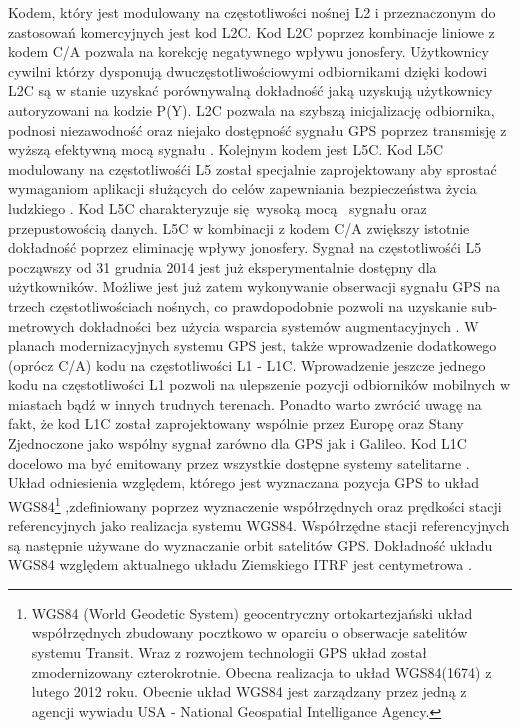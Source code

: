 Kodem, który jest modulowany na częstotliwości nośnej L2 i przeznaczonym do zastosowań komercyjnych jest kod L2C. Kod L2C poprzez kombinacje liniowe z kodem C/A pozwala 
na korekcję negatywnego wpływu jonosfery. Użytkownicy cywilni którzy dysponują dwuczęstotliwościowymi odbiornikami dzięki kodowi L2C są w stanie uzyskać porównywalną
dokładność jaką uzyskują użytkownicy autoryzowani na kodzie P(Y). L2C pozwala na szybszą inicjalizację odbiornika, podnosi niezawodność oraz niejako dostępność sygnału 
GPS poprzez transmisję z wyższą efektywną mocą sygnału \cite[]{GPS_GOV}. Kolejnym kodem jest L5C. Kod L5C modulowany na częstotliwośći L5 został specjalnie zaprojektowany 
aby sprostać wymaganiom aplikacji służących do celów zapewniania bezpieczeństwa życia ludzkiego \cite[][strona 335]{hofmann_gnss}. Kod L5C charakteryzuje się wysoką mocą 
sygnału oraz przepustowością danych. L5C w kombinacji z kodem C/A zwiększy istotnie dokładność poprzez eliminację wpływy jonosfery. Sygnał na częstotliwośći L5 
począwszy od 31 grudnia 2014 jest już eksperymentalnie dostępny dla użytkowników. Możliwe jest już zatem wykonywanie obserwacji sygnału GPS na trzech częstotliwościach nośnych,
co prawdopodobnie pozwoli na uzyskanie sub-metrowych dokładności bez użycia wsparcia systemów augmentacyjnych \cite[]{GPS_GOV}. W planach modernizacyjnych systemu GPS jest,
także wprowadzenie dodatkowego (oprócz C/A) kodu na częstotliwości L1 - L1C. Wprowadzenie jeszcze jednego kodu na częstotliwości L1 pozwoli na ulepszenie pozycji 
odbiorników mobilnych w miastach bądź w innych trudnych terenach. Ponadto warto zwrócić uwagę na fakt, że kod L1C został zaprojektowany wspólnie przez Europę oraz 
Stany Zjednoczone jako wspólny sygnał zarówno dla GPS jak i Galileo. Kod L1C docelowo ma być emitowany przez wszystkie dostępne systemy satelitarne \cite[]{GPS_GOV}.\\
\indent Układ odniesienia względem, którego jest wyznaczana pozycja GPS to układ WGS84\footnote{WGS84 (World Geodetic System) geocentryczny ortokartezjański układ współrzędnych
zbudowany pocztkowo w oparciu o obserwacje satelitów systemu Transit. Wraz z rozwojem technologii GPS układ został zmodernizowany czterokrotnie.
Obecna realizacja to układ WGS84(1674) z lutego 2012 roku. Obecnie układ WGS84 jest zarządzany przez jedną z agencji wywiadu USA - National Geospatial Intelligance Agency.}
,zdefiniowany poprzez wyznaczenie współrzędnych oraz prędkości stacji referencyjnych jako realizacja systemu WGS84. Współrzędne stacji referencyjnych są następnie 
używane do wyznaczanie orbit satelitów GPS. Dokładność układu WGS84 względem aktualnego układu Ziemskiego ITRF jest centymetrowa \cite[][strona 51]{donnelly}.
